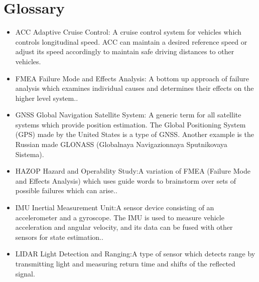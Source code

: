 \section{Glossary}
\label{glossary}

\begin{itemize}
\item ACC Adaptive Cruise Control: A cruise control system for vehicles which controls longitudinal speed. 
ACC can maintain a desired reference speed or adjust its speed accordingly to maintain safe driving distances to other vehicles.
\end{itemize}

\begin{itemize}
\item FMEA Failure Mode and Effects Analysis: A bottom up approach of failure analysis which examines individual 
causes and determines their effects on the higher level system..
\end{itemize}

\begin{itemize}
\item GNSS Global Navigation Satellite System: A generic term for all satellite systems which provide position estimation. 
The Global Positioning System (GPS) made by the United States is a type of GNSS. 
Another example is the Russian made GLONASS (Globalnaya Navigazionnaya Sputnikovaya Sistema).
\end{itemize}

\begin{itemize}
\item HAZOP Hazard and Operability Study:A variation of FMEA (Failure Mode and Effects Analysis) which uses 
guide words to brainstorm over sets of possible failures which can arise..
\end{itemize}

\begin{itemize}
\item IMU Inertial Measurement Unit:A sensor device consisting of an accelerometer and a gyroscope. 
The IMU is used to measure vehicle acceleration and angular velocity, 
and its data can be fused with other sensors for state estimation..
\end{itemize}

\begin{itemize}
\item LIDAR Light Detection and Ranging:A type of sensor which detects range by transmitting 
light and measuring return time and shifts of the reflected signal.
\end{itemize}

